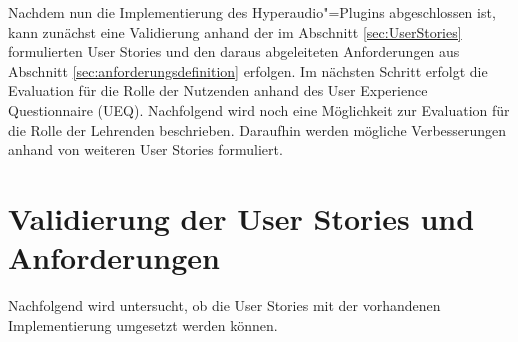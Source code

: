 \label{cap:evaluation}
Nachdem nun die Implementierung des Hyperaudio"=Plugins abgeschlossen ist, kann zunächst eine Validierung anhand der im Abschnitt \ref{sec:UserStories} formulierten User Stories und den daraus abgeleiteten Anforderungen aus Abschnitt \ref{sec:anforderungsdefinition} erfolgen. Im nächsten Schritt erfolgt die Evaluation für die Rolle der Nutzenden anhand des User Experience Questionnaire (UEQ). Nachfolgend wird noch eine Möglichkeit zur Evaluation für die Rolle der Lehrenden beschrieben. Daraufhin werden mögliche Verbesserungen anhand von weiteren User Stories formuliert.




\section{Validierung der User Stories und Anforderungen}
Nachfolgend wird untersucht, ob die User Stories mit der vorhandenen Implementierung umgesetzt werden können.

